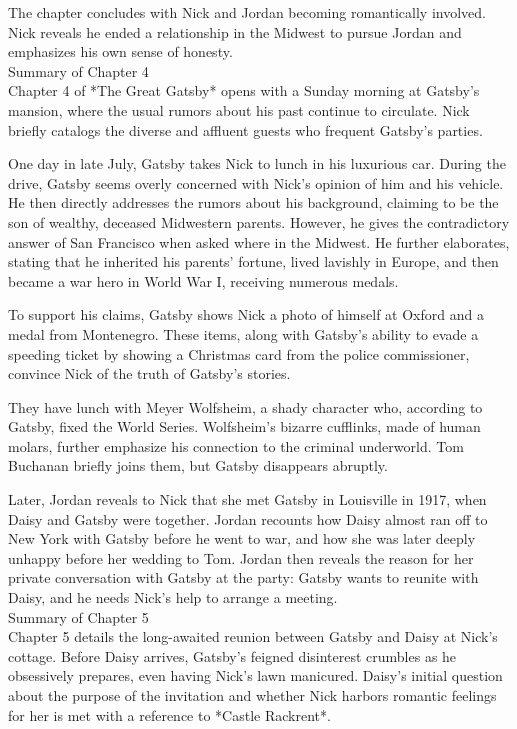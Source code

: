 \begin{tcolorbox}[title = {History}, breakable]
The chapter concludes with Nick and Jordan becoming romantically involved.  Nick reveals he ended a relationship in the Midwest to pursue Jordan and emphasizes his own sense of honesty.
\\Summary of Chapter 4 \\
Chapter 4 of *The Great Gatsby* opens with a Sunday morning at Gatsby's mansion, where the usual rumors about his past continue to circulate. Nick briefly catalogs the diverse and affluent guests who frequent Gatsby's parties.

One day in late July, Gatsby takes Nick to lunch in his luxurious car.  During the drive, Gatsby seems overly concerned with Nick's opinion of him and his vehicle. He then directly addresses the rumors about his background, claiming to be the son of wealthy, deceased Midwestern parents.  However, he gives the contradictory answer of San Francisco when asked where in the Midwest.  He further elaborates, stating that he inherited his parents' fortune, lived lavishly in Europe, and then became a war hero in World War I, receiving numerous medals.

To support his claims, Gatsby shows Nick a photo of himself at Oxford and a medal from Montenegro.  These items, along with Gatsby's ability to evade a speeding ticket by showing a Christmas card from the police commissioner, convince Nick of the truth of Gatsby's stories.

They have lunch with Meyer Wolfsheim, a shady character who, according to Gatsby, fixed the World Series. Wolfsheim's bizarre cufflinks, made of human molars, further emphasize his connection to the criminal underworld.  Tom Buchanan briefly joins them, but Gatsby disappears abruptly.

Later, Jordan reveals to Nick that she met Gatsby in Louisville in 1917, when Daisy and Gatsby were together.  Jordan recounts how Daisy almost ran off to New York with Gatsby before he went to war, and how she was later deeply unhappy before her wedding to Tom.  Jordan then reveals the reason for her private conversation with Gatsby at the party: Gatsby wants to reunite with Daisy, and he needs Nick's help to arrange a meeting.
\\Summary of Chapter 5 \\
Chapter 5 details the long-awaited reunion between Gatsby and Daisy at Nick's cottage.  Before Daisy arrives, Gatsby's feigned disinterest crumbles as he obsessively prepares, even having Nick's lawn manicured.  Daisy's initial question about the purpose of the invitation and whether Nick harbors romantic feelings for her is met with a reference to *Castle Rackrent*.


\end{tcolorbox}
